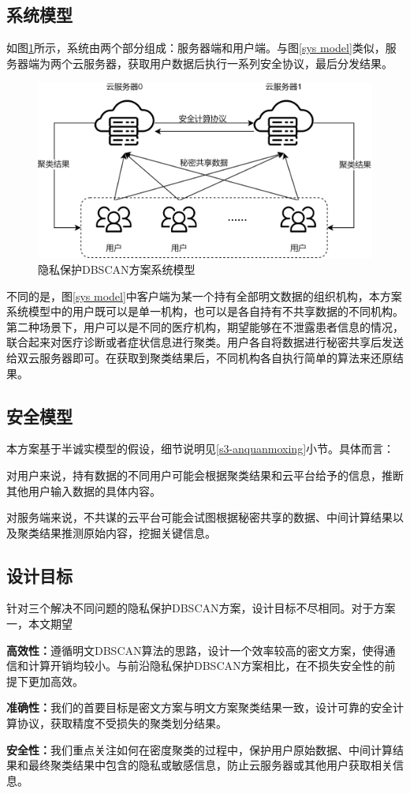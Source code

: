 \subsection{系统模型}
如图\ref{s4-sysmod}所示，系统由两个部分组成：服务器端和用户端。与图\ref{sys model}类似，服务器端为两个云服务器，获取用户数据后执行一系列安全协议，最后分发结果。
\begin{figure}[htbp]
	\centering
	\includegraphics[width=0.7\linewidth]{img/sysmodel2.png}%
	\caption{隐私保护DBSCAN方案系统模型}
	\label{s4-sysmod}
\end{figure}

不同的是，图\ref{sys model}中客户端为某一个持有全部明文数据的组织机构，本方案系统模型中的用户既可以是单一机构，也可以是各自持有不共享数据的不同机构。第二种场景下，用户可以是不同的医疗机构，期望能够在不泄露患者信息的情况，联合起来对医疗诊断或者症状信息进行聚类。用户各自将数据进行秘密共享后发送给双云服务器即可。在获取到聚类结果后，不同机构各自执行简单的算法来还原结果。


\subsection{安全模型}
本方案基于半诚实模型的假设，细节说明见\ref{s3-anquanmoxing}小节。具体而言：

对用户来说，持有数据的不同用户可能会根据聚类结果和云平台给予的信息，推断其他用户输入数据的具体内容。

对服务端来说，不共谋的云平台可能会试图根据秘密共享的数据、中间计算结果以及聚类结果推测原始内容，挖掘关键信息。
\subsection{设计目标}
针对三个解决不同问题的隐私保护DBSCAN方案，设计目标不尽相同。对于方案一，本文期望
\begin{compactitem}
	\item\textbf{高效性：}遵循明文DBSCAN算法的思路，设计一个效率较高的密文方案，使得通信和计算开销均较小。与前沿隐私保护DBSCAN方案相比，在不损失安全性的前提下更加高效。
	\item\textbf{准确性：}我们的首要目标是密文方案与明文方案聚类结果一致，设计可靠的安全计算协议，获取精度不受损失的聚类划分结果。
	\item\textbf{安全性：}我们重点关注如何在密度聚类的过程中，保护用户原始数据、中间计算结果和最终聚类结果中包含的隐私或敏感信息，防止云服务器或其他用户获取相关信息。
\end{compactitem}

